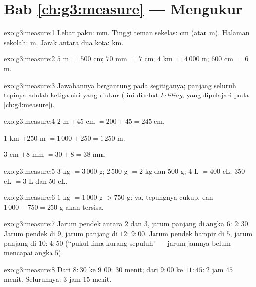 \section*{Bab \ref{ch:g3:measure} --- Mengukur}

\begin{solution}{exo:g3:measure:1}
Lebar paku: mm. Tinggi teman sekelas: cm (atau m). Halaman sekolah:
m. Jarak antara dua kota: km.
\end{solution}

\begin{solution}{exo:g3:measure:2}
$5$ m $= 500$ cm; \quad $70$ mm $= 7$ cm; \quad
$4$ km $= 4\,000$ m; \quad $600$ cm $= 6$ m.
\end{solution}

\begin{solution}{exo:g3:measure:3}
Jawabannya bergantung pada segitiganya; panjang seluruh tepinya
adalah  ketiga sisi yang diukur ( ini disebut
\emph{keliling}, yang dipelajari pada \cref{ch:g4:measure}).
\end{solution}

\begin{solution}{exo:g3:measure:4}
$2$ m $+ 45$ cm $= 200 + 45 = 245$ cm.

$1$ km $+ 250$ m $= 1\,000 + 250 = 1\,250$ m.

$3$ cm $+ 8$ mm $= 30 + 8 = 38$ mm.
\end{solution}

\begin{solution}{exo:g3:measure:5}
$3$ kg $= 3\,000$ g; \quad $2\,500$ g $= 2$ kg dan $500$ g; \quad
$4$ L $= 400$ cL; \quad $350$ cL $= 3$ L dan $50$ cL.
\end{solution}

\begin{solution}{exo:g3:measure:6}
$1$ kg $= 1\,000$ g $> 750$ g: ya, tepungnya cukup, dan
$1\,000 - 750 = 250$ g akan tersisa.
\end{solution}

\begin{solution}{exo:g3:measure:7}
Jarum pendek antara $2$ dan $3$, jarum panjang di angka $6$:
$2{:}30$. Jarum pendek di $9$, jarum panjang di $12$: $9{:}00$.
Jarum pendek hampir di $5$, jarum panjang di $10$: $4{:}50$ (``pukul
lima kurang sepuluh'' --- jarum jamnya belum mencapai angka $5$).
\end{solution}

\begin{solution}{exo:g3:measure:8}
Dari $8{:}30$ ke $9{:}00$: $30$ menit; dari $9{:}00$ ke $11{:}45$:
$2$ jam $45$ menit. Seluruhnya: $3$ jam $15$ menit.
\end{solution}

